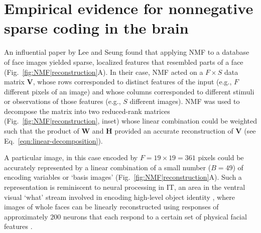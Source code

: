 \section*{Empirical evidence for nonnegative sparse coding in the brain}

An influential paper by Lee and Seung \cite{LeeSeung1999}
found that applying \ac{NMF} to a database of face images
yielded sparse, localized features that resembled parts of a face
(Fig.~\ref{fig:NMF|reconstruction}A).
In their case, \ac{NMF} acted on a
$F \times S$ data matrix \textbf{V},
whose rows corresponded to distinct features of the input 
(e.g., $F$ different pixels of an image)
and whose columns corresponded to different stimuli or 
observations of those features
(e.g., $S$ different images).
\ac{NMF} was used to decompose the matrix into two reduced-rank matrices
(Fig.~\ref{fig:NMF|reconstruction}, inset)
whose linear combination could be weighted such that the product of \textbf{W} and \textbf{H} provided an accurate reconstruction of \textbf{V}
(see Eq.~\ref{eqn:linear-decomposition}).

A particular image, in this case encoded by $F = 19 \times 19 = 361$ pixels
could be accurately represented by a linear combination of 
a small number ($B = 49$) of encoding variables or `basis images'
(Fig.~\ref{fig:NMF|reconstruction}A).
Such a representation is reminiscent to neural processing in \ac{IT},
an area in the ventral visual `what' stream
involved in encoding high-level object identity
\cite{BrincatConnor2004,Majaj2015},
where images of whole faces can be linearly reconstructed
using responses of approximately $200$ neurons
that each respond to a certain set of physical facial features
\cite{ChangTsao2017}.

